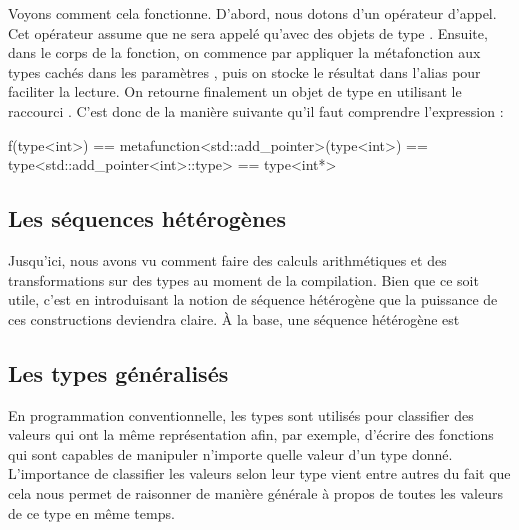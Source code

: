 Voyons comment cela fonctionne. D'abord, nous dotons 
d'un opérateur d'appel. Cet opérateur assume que  ne
sera appelé qu'avec des objets de type . Ensuite, dans le corps
de la fonction, on commence par appliquer la métafonction  aux types
 cachés dans les paramètres , puis on stocke le
résultat dans l'alias  pour faciliter la lecture. On retourne
finalement un objet de type  en utilisant le raccourci
. C'est donc de la manière suivante qu'il faut comprendre
l'expression :
\begin{cpp}
    f(type<int>) == metafunction<std::add_pointer>(type<int>)
                 == type<std::add_pointer<int>::type>
                 == type<int*>
\end{cpp}


\subsection{Les séquences hétérogènes}
Jusqu'ici, nous avons vu comment faire des calculs arithmétiques et des
transformations sur des types au moment de la compilation. Bien que ce soit
utile, c'est en introduisant la notion de séquence hétérogène que la puissance
de ces constructions deviendra claire. À la base, une séquence hétérogène est



\subsection{Les types généralisés}
En programmation conventionnelle, les types sont utilisés pour classifier
des valeurs qui ont la même représentation afin, par exemple, d'écrire
des fonctions qui sont capables de manipuler n'importe quelle valeur
d'un type donné. L'importance de classifier les valeurs selon leur type
vient entre autres du fait que cela nous permet de raisonner de manière
générale à propos de toutes les valeurs de ce type en même temps.


